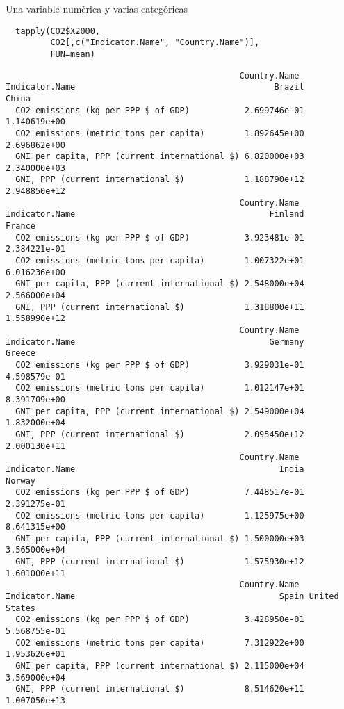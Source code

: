 \documentclass[xcolor={usenames,svgnames,dvipsnames}]{beamer}
\begin{document}
\begin{frame}[fragile,label=sec-2-1-2]{Una variable numérica y varias categóricas}
 \lstset{language=R,label= ,caption= ,numbers=none}
\begin{lstlisting}
  tapply(CO2$X2000,
         CO2[,c("Indicator.Name", "Country.Name")],
         FUN=mean)
\end{lstlisting}

\begin{verbatim}
                                               Country.Name
Indicator.Name                                        Brazil        China
  CO2 emissions (kg per PPP $ of GDP)           2.699746e-01 1.140619e+00
  CO2 emissions (metric tons per capita)        1.892645e+00 2.696862e+00
  GNI per capita, PPP (current international $) 6.820000e+03 2.340000e+03
  GNI, PPP (current international $)            1.188790e+12 2.948850e+12
                                               Country.Name
Indicator.Name                                       Finland       France
  CO2 emissions (kg per PPP $ of GDP)           3.923481e-01 2.384221e-01
  CO2 emissions (metric tons per capita)        1.007322e+01 6.016236e+00
  GNI per capita, PPP (current international $) 2.548000e+04 2.566000e+04
  GNI, PPP (current international $)            1.318800e+11 1.558990e+12
                                               Country.Name
Indicator.Name                                       Germany       Greece
  CO2 emissions (kg per PPP $ of GDP)           3.929031e-01 4.598579e-01
  CO2 emissions (metric tons per capita)        1.012147e+01 8.391709e+00
  GNI per capita, PPP (current international $) 2.549000e+04 1.832000e+04
  GNI, PPP (current international $)            2.095450e+12 2.000130e+11
                                               Country.Name
Indicator.Name                                         India       Norway
  CO2 emissions (kg per PPP $ of GDP)           7.448517e-01 2.391275e-01
  CO2 emissions (metric tons per capita)        1.125975e+00 8.641315e+00
  GNI per capita, PPP (current international $) 1.500000e+03 3.565000e+04
  GNI, PPP (current international $)            1.575930e+12 1.601000e+11
                                               Country.Name
Indicator.Name                                         Spain United States
  CO2 emissions (kg per PPP $ of GDP)           3.428950e-01  5.568755e-01
  CO2 emissions (metric tons per capita)        7.312922e+00  1.953626e+01
  GNI per capita, PPP (current international $) 2.115000e+04  3.569000e+04
  GNI, PPP (current international $)            8.514620e+11  1.007050e+13
\end{verbatim}
\end{frame}
\end{document}
